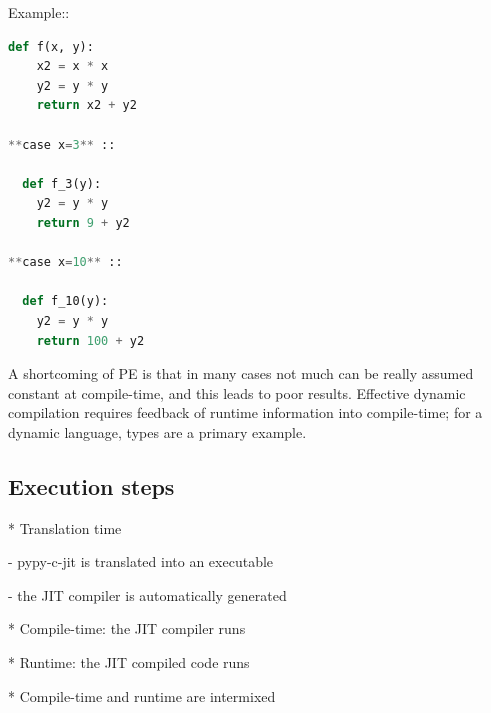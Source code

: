 Example::
\begin{lstlisting}[language=Python]
  def f(x, y):    
    x2 = x * x    
    y2 = y * y    
    return x2 + y2

**case x=3** ::

  def f_3(y):    
    y2 = y * y   
    return 9 + y2

**case x=10** ::

  def f_10(y):    
    y2 = y * y   
    return 100 + y2
\end{lstlisting}

A shortcoming of PE is that in many cases not much can be really assumed
constant at compile-time, and this leads to poor results.  Effective dynamic
compilation requires feedback of runtime information into compile-time; for a
dynamic language, types are a primary example.


\subsection{Execution steps}

* Translation time

  - pypy-c-jit is translated into an executable

  - the JIT compiler is automatically generated

* Compile-time: the JIT compiler runs

* Runtime: the JIT compiled code runs

* Compile-time and runtime are intermixed
